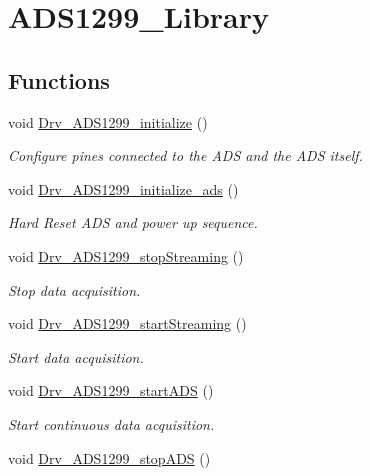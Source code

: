 \hypertarget{group___a_d_s1299___library}{}\section{A\+D\+S1299\+\_\+\+Library}
\label{group___a_d_s1299___library}
\subsection*{Functions}
\begin{DoxyCompactItemize}
\item 
void \hyperlink{group___a_d_s1299___library_ga3a5f7edb0cb404ffa6865a56573a0c4b}{Drv\+\_\+\+A\+D\+S1299\+\_\+initialize} ()
\begin{DoxyCompactList}\small\item\em Configure pines connected to the A\+D\+S and the A\+D\+S itself. \end{DoxyCompactList}\item 
void \hyperlink{group___a_d_s1299___library_ga7d4e3c16375e804d9275b55a5872410b}{Drv\+\_\+\+A\+D\+S1299\+\_\+initialize\+\_\+ads} ()
\begin{DoxyCompactList}\small\item\em Hard Reset A\+D\+S and power up sequence. \end{DoxyCompactList}\item 
void \hyperlink{group___a_d_s1299___library_ga76f9b41b04d6ac6a9fc5ba36884df125}{Drv\+\_\+\+A\+D\+S1299\+\_\+stop\+Streaming} ()
\begin{DoxyCompactList}\small\item\em Stop data acquisition. \end{DoxyCompactList}\item 
void \hyperlink{group___a_d_s1299___library_gad3ea6087f205bfce6610c763f3f332d3}{Drv\+\_\+\+A\+D\+S1299\+\_\+start\+Streaming} ()
\begin{DoxyCompactList}\small\item\em Start data acquisition. \end{DoxyCompactList}\item 
void \hyperlink{group___a_d_s1299___library_gad2841df2e1508c7d9f86d0d90681986e}{Drv\+\_\+\+A\+D\+S1299\+\_\+start\+A\+D\+S} ()
\begin{DoxyCompactList}\small\item\em Start continuous data acquisition. \end{DoxyCompactList}\item 
void \hyperlink{group___a_d_s1299___library_gafed9edc40d47ce6fc0c7c5325b616d74}{Drv\+\_\+\+A\+D\+S1299\+\_\+stop\+A\+D\+S} ()

\end{DoxyCompactItemize}
